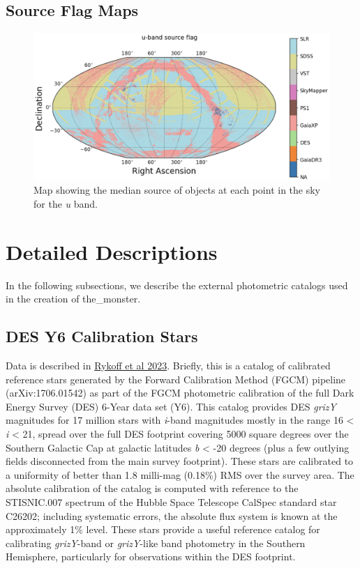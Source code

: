 \subsection{Source Flag Maps}
\begin{figure}
    \centering
    \includegraphics[width=\linewidth]{./figures/source_survey_maps/u-band_source.png}
    \caption{Map showing the median source of objects at each point in the sky for the \textit{u} band.}
    \label{source-flag-u}
\end{figure}

\section{Detailed Descriptions}
In the following subsections, we describe the external photometric catalogs used in the creation of the\_monster.

\subsection{DES Y6 Calibration Stars}
Data is described in \href{https://arxiv.org/abs/2305.01695}{Rykoff et al 2023}. Briefly, this is a catalog of calibrated reference stars generated by the Forward Calibration Method (FGCM) pipeline (arXiv:1706.01542) as part of the FGCM photometric calibration of the full Dark Energy Survey (DES) 6-Year data set (Y6). This catalog provides DES \textit{grizY} magnitudes for 17 million stars with \textit{i}-band magnitudes mostly in the range 16 < \textit{i} < 21, spread over the full DES footprint covering 5000 square degrees over the Southern Galactic Cap at galactic latitudes \textit{b} < -20 degrees (plus a few outlying fields disconnected from the main survey footprint). These stars are calibrated to a uniformity of better than 1.8 milli-mag (0.18\%) RMS over the survey area. The absolute calibration of the catalog is computed with reference to the STISNIC.007 spectrum of the Hubble Space Telescope CalSpec standard star C26202; including systematic errors, the absolute flux system is known at the approximately 1\% level. These stars provide a useful reference catalog for calibrating \textit{grizY}-band or \textit{grizY}-like band photometry in the Southern Hemisphere, particularly for observations within the DES footprint.

